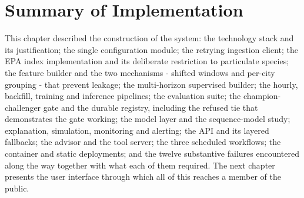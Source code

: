 \section{Summary of Implementation}
This chapter described the construction of the system: the technology stack and
its justification; the single configuration module; the retrying ingestion client;
the EPA index implementation and its deliberate restriction to particulate
species; the feature builder and the two mechanisms - shifted windows and
per-city grouping - that prevent leakage; the multi-horizon supervised builder;
the hourly, backfill, training and inference pipelines; the evaluation suite; the
champion-challenger gate and the durable registry, including the refused tie that
demonstrates the gate working; the model layer and the sequence-model study;
explanation, simulation, monitoring and alerting; the API and its layered
fallbacks; the advisor and the tool server; the three scheduled workflows; the
container and static deployments; and the twelve substantive failures encountered
along the way together with what each of them required. The next chapter presents
the user interface through which all of this reaches a member of the public.

